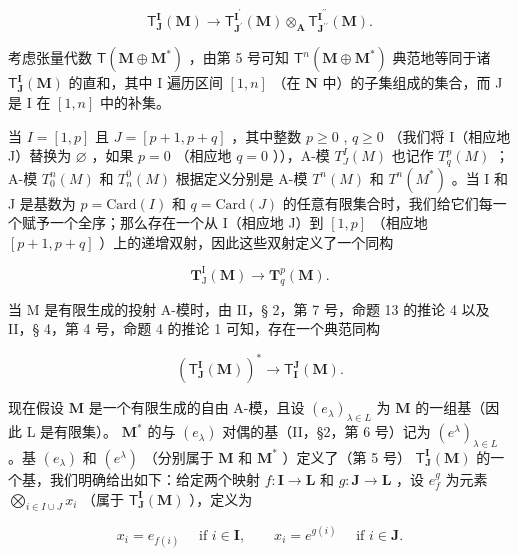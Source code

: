 \[
\mathsf {T} _ {\mathbf {J}} ^ {\mathbf {I}} (\mathbf {M}) \rightarrow \mathsf {T} _ {\mathbf {J} ^ {\prime}} ^ {\mathbf {I} ^ {\prime}} (\mathbf {M}) \otimes_ {\mathbf {A}} \mathsf {T} _ {\mathbf {J} ^ {\prime \prime}} ^ {\mathbf {I} ^ {\prime \prime}} (\mathbf {M}).\tag{11}
\]

考虑张量代数 \(\mathsf{T}(\mathbf{M}\oplus \mathbf{M}^{*})\) ，由第 5 号可知 \(\mathsf{T}^n (\mathbf{M}\oplus \mathbf{M}^*)\) 典范地等同于诸 \(\mathsf{T}_{\mathbf{J}}^{\mathbf{I}}(\mathbf{M})\) 的直和，其中 I 遍历区间 \([1,n]\) （在 \(\mathbf{N}\) 中）的子集组成的集合，而 J 是 I 在 \([1,n]\) 中的补集。

当 \(I = [1, p]\) 且 \(J = [p + 1, p + q]\) ，其中整数 \(p \geqslant 0\) , \(q \geqslant 0\) （我们将 I（相应地 J）替换为 \(\varnothing\) ，如果 \(p = 0\) （相应地 \(q = 0\) ）），A-模 \(T_J^I(M)\) 也记作 \(T_q^p(M)\) ；A-模 \(T_0^n(M)\) 和 \(T_n^0(M)\) 根据定义分别是 A-模 \(T^n(M)\) 和 \(T^n(M^*)\) 。当 I 和 J 是基数为 \(p = \text{Card}(I)\) 和 \(q = \text{Card}(J)\) 的任意有限集合时，我们给它们每一个赋予一个全序；那么存在一个从 I（相应地 J）到 \([1, p]\) （相应地 \([p + 1, p + q]\) ）上的递增双射，因此这些双射定义了一个同构

\[
\mathbf {T} _ {\mathrm{J}} ^ {\mathrm{I}} (\mathbf {M}) \rightarrow \mathbf {T} _ {q} ^ {p} (\mathbf {M}).
\]

当 M 是有限生成的投射 A-模时，由 II，§ 2，第 7 号，命题 13 的推论 4 以及 II，§ 4，第 4 号，命题 4 的推论 1 可知，存在一个典范同构

\[
(\mathsf {T} _ {\mathbf {J}} ^ {\mathbf {I}} (\mathbf {M})) ^ {*} \to \mathsf {T} _ {\mathbf {I}} ^ {\mathbf {J}} (\mathbf {M}).
\]

现在假设 \(\mathbf{M}\) 是一个有限生成的自由 A-模，且设 \((e_{\lambda})_{\lambda \in L}\) 为 \(\mathbf{M}\) 的一组基（因此 L 是有限集）。 \(\mathbf{M}^*\) 的与 \((e_{\lambda})\) 对偶的基（II，§2，第 6 号）记为 \((e^{\lambda})_{\lambda \in L}\) 。基 \((e_{\lambda})\) 和 \((e^{\lambda})\) （分别属于 \(\mathbf{M}\) 和 \(\mathbf{M}^*\) ）定义了（第 5 号） \(\mathsf{T}_{\mathbf{J}}^{\mathbf{I}}(\mathbf{M})\) 的一个基，我们明确给出如下：给定两个映射 \(f\colon \mathbf{I} \to \mathbf{L}\) 和 \(g\colon \mathbf{J} \to \mathbf{L}\) ，设 \(e_f^g\) 为元素 \(\bigotimes_{i \in I \cup J} x_i\) （属于 \(\mathsf{T}_{\mathbf{J}}^{\mathbf{I}}(\mathbf{M})\) ），定义为

\[
x _ {i} = e _ {f (i)} \quad \text { if } i \in \mathbf {I}, \qquad x _ {i} = e ^ {g (i)} \quad \text { if } i \in \mathbf {J}.
\]

